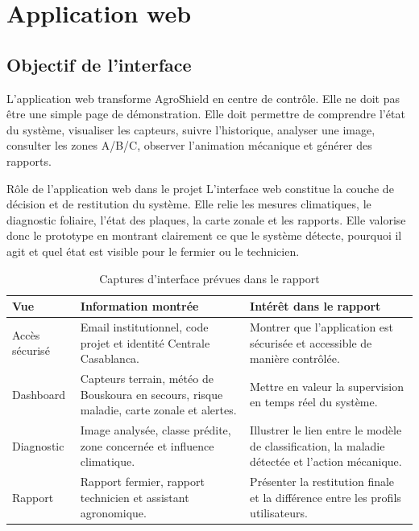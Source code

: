 ﻿\documentclass[11pt,a4paper,openany]{report}
\begin{document}
\chapter{Application web}
\section{Objectif de l'interface}
L'application web transforme AgroShield en centre de contrôle. Elle ne doit pas être une simple page de démonstration. Elle doit permettre de comprendre l'état du système, visualiser les capteurs, suivre l'historique, analyser une image, consulter les zones A/B/C, observer l'animation mécanique et générer des rapports.

\begin{importantbox}{Rôle de l'application web dans le projet}
L'interface web constitue la couche de décision et de restitution du système. Elle relie les mesures climatiques, le diagnostic foliaire, l'état des plaques, la carte zonale et les rapports. Elle valorise donc le prototype en montrant clairement ce que le système détecte, pourquoi il agit et quel état est visible pour le fermier ou le technicien.
\end{importantbox}

\begin{table}[H]
\centering
\renewcommand{\arraystretch}{1.35}

\begin{tabular}{|p{2.5cm}|p{5cm}|p{5cm}|}
\hline
\textbf{Vue} &
\textbf{Information montrée} &
\textbf{Intérêt dans le rapport} \\
\hline

Accès sécurisé &
Email institutionnel, code projet et identité Centrale Casablanca. &
Montrer que l'application est sécurisée et accessible de manière contrôlée. \\
\hline

Dashboard &
Capteurs terrain, météo de Bouskoura en secours, risque maladie, carte zonale et alertes. &
Mettre en valeur la supervision en temps réel du système. \\
\hline

Diagnostic &
Image analysée, classe prédite, zone concernée et influence climatique. &
Illustrer le lien entre le modèle de classification, la maladie détectée et l'action mécanique. \\
\hline

Rapport &
Rapport fermier, rapport technicien et assistant agronomique. &
Présenter la restitution finale et la différence entre les profils utilisateurs. \\
\hline

\end{tabular}

\caption{Captures d'interface prévues dans le rapport}
\label{tab:interfaces}
\end{table}
\end{document}

